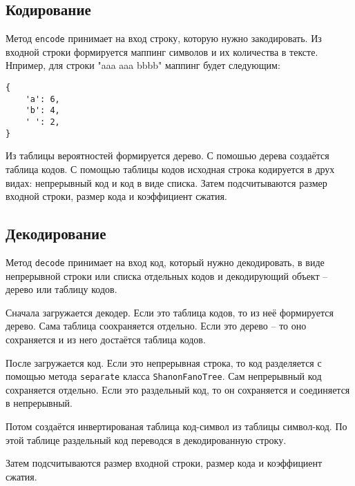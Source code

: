 \subsection{Кодирование}

Метод \verb|encode| принимает на вход строку,
которую нужно закодировать.
Из входной строки формируется маппинг символов
и их количества в тексте.
Нпример, для строки "aaa aaa bbbb" маппинг будет следующим:

\begin{lstlisting}
{
    'a': 6,
    'b': 4,
    ' ': 2,
}
\end{lstlisting}

Из таблицы вероятностей формируется дерево.
С помошью дерева создаётся таблица кодов.
С помощью таблицы кодов исходная 
строка кодируется в друх видах:
непрерывный код и код в виде списка.
Затем подсчитываются размер входной строки,
размер кода и коэффициент сжатия.

\subsection{Декодирование}

Метод \verb|decode| принимает на вход код,
который нужно декодировать, в виде непрерывной строки
или списка отдельных кодов и декодирующий объект -- дерево
или таблицу кодов.

Сначала загружается декодер.
Если это таблица кодов, то из неё формируется
дерево.
Сама таблица соохраняется отдельно.
Если это дерево -- то оно сохраняется и из
него достаётся таблица кодов.

После загружается код.
Если это непрерывная строка, то код разделяется
с помощью метода \verb|separate| класса \verb|ShanonFanoTree|.
Сам непрерывный код сохраняется отдельно.
Если это раздельный код, то он сохраняется 
и соединяется в непрерывный.

Потом создаётся инвертированая таблица код-символ
из таблицы символ-код.
По этой таблице раздельный код переводся в
декодированную строку.

Затем подсчитываются размер входной строки,
размер кода и коэффициент сжатия.